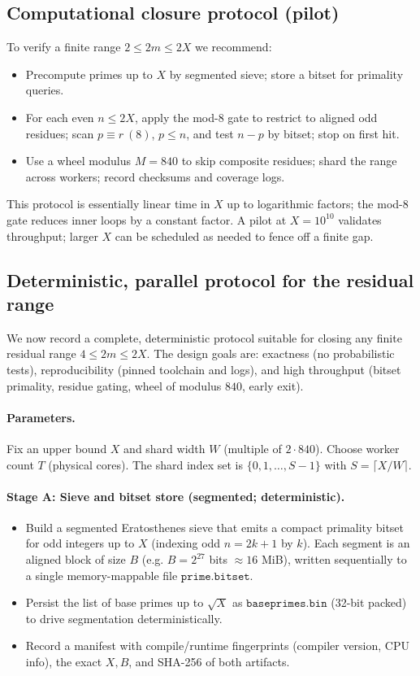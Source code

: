 \documentclass[11pt]{article}
\theoremstyle{definition}
\theoremstyle{remark}
\begin{document}
\subsection*{Computational closure protocol (pilot)}
To verify a finite range $2\le 2m\le 2X$ we recommend:
\begin{itemize}
  \item Precompute primes up to $X$ by segmented sieve; store a bitset for primality queries.
  \item For each even $n\le 2X$, apply the mod-8 gate to restrict to aligned odd residues; scan $p\equiv r\ (8)$, $p\le n$, and test $n-p$ by bitset; stop on first hit.
  \item Use a wheel modulus $M=840$ to skip composite residues; shard the range across workers; record checksums and coverage logs.
\end{itemize}
This protocol is essentially linear time in $X$ up to logarithmic factors; the mod-8 gate reduces inner loops by a constant factor. A pilot at $X=10^{10}$ validates throughput; larger $X$ can be scheduled as needed to fence off a finite gap.

\subsection*{Deterministic, parallel protocol for the residual range}
We now record a complete, deterministic protocol suitable for closing any finite residual range $4\le 2m\le 2X$. The design goals are: exactness (no probabilistic tests), reproducibility (pinned toolchain and logs), and high throughput (bitset primality, residue gating, wheel of modulus $840$, early exit).

\paragraph{Parameters.} Fix an upper bound $X$ and shard width $W$ (multiple of $2\cdot 840$). Choose worker count $T$ (physical cores). The shard index set is $\{0,1,\dots, S{-}1\}$ with $S=\lceil X/W\rceil$.

\paragraph{Stage A: Sieve and bitset store (segmented; deterministic).}
\begin{itemize}
  \item Build a segmented Eratosthenes sieve that emits a compact primality bitset for odd integers up to $X$ (indexing odd $n=2k{+}1$ by $k$). Each segment is an aligned block of size $B$ (e.g. $B=2^{27}$ bits $\approx 16$ MiB), written sequentially to a single memory-mappable file $\texttt{prime.bitset}$.
  \item Persist the list of base primes up to $\sqrt{X}$ as $\texttt{baseprimes.bin}$ (32-bit packed) to drive segmentation deterministically.
  \item Record a manifest with compile/runtime fingerprints (compiler version, CPU info), the exact $X,B$, and SHA-256 of both artifacts.
\end{itemize}
\end{document}
